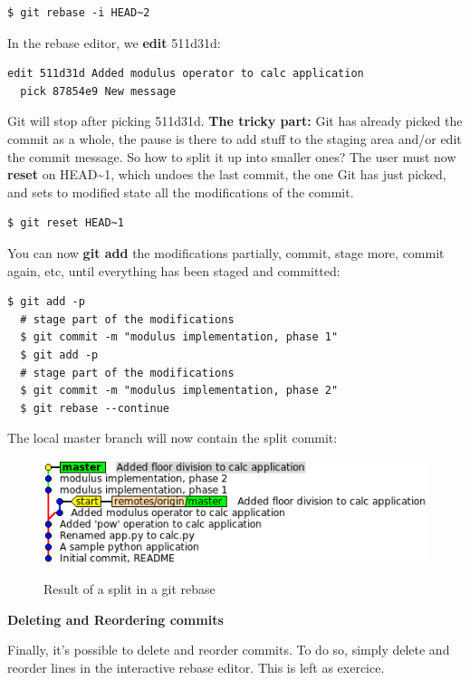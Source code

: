 \documentclass{../../common/tufte-latex/tufte-handout}
\begin{document}
\begin{lstlisting}[style=BashInputStyle]
  $ git rebase -i HEAD~2
\end{lstlisting}

In the rebase editor, we \textbf{edit} 511d31d:
\begin{lstlisting}[style=BashInputStyle]
  edit 511d31d Added modulus operator to calc application
  pick 87854e9 New message
\end{lstlisting}

Git will stop after picking 511d31d.
\textbf{The tricky part:} Git has already picked the commit as a whole, the pause is there to add stuff to the staging area and/or edit the commit message.
So how to split it up into smaller ones?
The user must now \textbf{reset} on HEAD\textasciitilde1, which undoes the last commit, the one Git has just picked, and sets to modified state all the modifications of the commit.

\begin{lstlisting}[style=BashInputStyle]
  $ git reset HEAD~1
\end{lstlisting}

You can now \textbf{git add} the modifications partially, commit, stage more, commit again, etc, until everything has been staged and committed:

\begin{lstlisting}[style=BashInputStyle]
  $ git add -p
  # stage part of the modifications
  $ git commit -m "modulus implementation, phase 1"
  $ git add -p
  # stage part of the modifications
  $ git commit -m "modulus implementation, phase 2"
  $ git rebase --continue
\end{lstlisting}

The local master branch will now contain the split commit:

\begin{figure}%
  \centering
  \includegraphics[width=0.75\linewidth]{gitrebase-split.png}
  \label{fig:gitrebase-split}
  \caption{Result of a split in a git rebase}
\end{figure}

\noindent \textbf{Deleting and Reordering commits}

Finally, it's possible to delete and reorder commits.
To do so, simply delete and reorder lines in the interactive rebase editor.
This is left as exercice.



\end{document}
